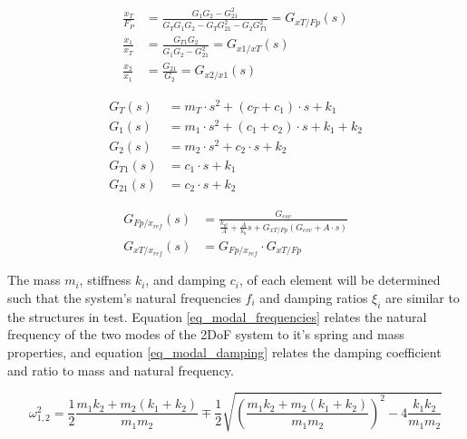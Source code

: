 \documentclass[10pt]{extarticle}
\begin{document}
\begin{minipage}{0.49\textwidth}

\begin{align}
    \frac{x_T}{F_P} &= \frac{G_1 G_2 - G_{21}^2}{G_T G_1 G_2 - G_T G_{21}^2 - G_2 G_{T1}^2} = G_{xT/Fp}(s) \label{G_xT_Fp}\\
    \frac{x_1}{x_T} &= \frac{G_{T1} G_2}{G_1 G_2 - G_{21}^2} = G_{x1/xT}(s) \\
    \frac{x_2}{x_1} &= \frac{G_{21}}{G_2} = G_{x2/x1}(s)
\end{align}
\end{minipage}
\hfill
\begin{minipage}{0.42\textwidth}
\begin{align}
    G_T(s) &= m_T\cdot s^2 + (c_T + c_1)\cdot s + k_1 \\
    G_1(s) &= m_1\cdot s^2 + (c_1 + c_2)\cdot s + k_1 + k_2 \\
    G_2(s) &= m_2\cdot s^2 + c_2\cdot s + k_2 \\
    G_{T1}(s) &= c_1\cdot s + k_1 \\
    G_{21}(s) &= c_2\cdot s + k_2 
\end{align}
\end{minipage}


\begin{align}
    G_{Fp/x_{ref}}(s) &= \frac{G_{csv}}{\frac{k_{pl}}{A} + \frac{A}{k_h} s + G_{xT/Fp} (G_{csv} + A\cdot s)} \\
    G_{xT/x_{ref}}(s) &= G_{Fp/x_{ref}} \cdot G_{xT/Fp} 
\end{align}

The mass $m_i$, stiffness $k_i$, and damping $c_i$, of each element will be determined such that the system's natural frequencies $f_i$ and damping ratios $\xi_i$ are similar to the structures in test. Equation \ref{eq_modal_frequencies} relates the natural frequency of the two modes of the 2DoF system to it's spring and mass properties, and equation \ref{eq_modal_damping} relates the damping coefficient and ratio to mass and natural frequency.

\begin{equation}\label{eq_modal_frequencies}
\omega_{1,2}^{2} = \frac{1}{2}\frac{m_1 k_2 + m_2 (k_1 + k_2)}{m_1 m_2} \mp \frac{1}{2} \sqrt{\left( \frac{m_1 k_2 + m_2 (k_1 + k_2)}{m_1 m_2} \right)^2 - 4 \frac{k_1 k_2}{m_1 m_2}} 
\end{equation}
\end{document}
